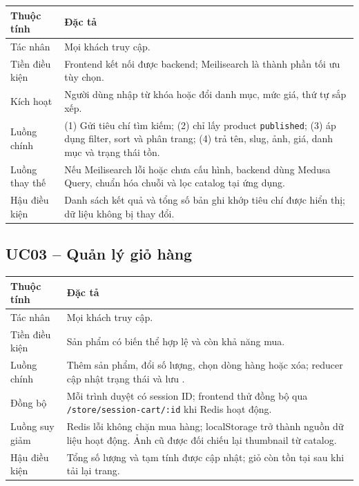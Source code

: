 \begin{longtable}{@{}L{0.23\textwidth}L{0.69\textwidth}@{}}
  \toprule
  \textbf{Thuộc tính} & \textbf{Đặc tả} \\
  \midrule
  Tác nhân & Mọi khách truy cập. \\
  Tiền điều kiện & Frontend kết nối được backend; Meilisearch là thành phần tối ưu tùy chọn. \\
  Kích hoạt & Người dùng nhập từ khóa hoặc đổi danh mục, mức giá, thứ tự sắp xếp. \\
  Luồng chính & (1) Gửi tiêu chí tìm kiếm; (2) chỉ lấy product \texttt{published}; (3) áp dụng filter, sort và phân trang; (4) trả tên, slug, ảnh, giá, danh mục và trạng thái tồn. \\
  Luồng thay thế & Nếu Meilisearch lỗi hoặc chưa cấu hình, backend dùng Medusa Query, chuẩn hóa chuỗi và lọc catalog tại ứng dụng. \\
  Hậu điều kiện & Danh sách kết quả và tổng số bản ghi khớp tiêu chí được hiển thị; dữ liệu không bị thay đổi. \\
  \bottomrule
\end{longtable}

\subsection{UC03 -- Quản lý giỏ hàng}

\begin{longtable}{@{}L{0.23\textwidth}L{0.69\textwidth}@{}}
  \toprule
  \textbf{Thuộc tính} & \textbf{Đặc tả} \\
  \midrule
  Tác nhân & Mọi khách truy cập. \\
  Tiền điều kiện & Sản phẩm có biến thể hợp lệ và còn khả năng mua. \\
  Luồng chính & Thêm sản phẩm, đổi số lượng, chọn dòng hàng hoặc xóa; reducer cập nhật trạng thái và lưu . \\
  Đồng bộ & Mỗi trình duyệt có session ID; frontend thử đồng bộ qua \texttt{/store/session-cart/:id} khi Redis hoạt động. \\
  Luồng suy giảm & Redis lỗi không chặn mua hàng; localStorage trở thành nguồn dữ liệu hoạt động. Ảnh cũ được đối chiếu lại thumbnail từ catalog. \\
  Hậu điều kiện & Tổng số lượng và tạm tính được cập nhật; giỏ còn tồn tại sau khi tải lại trang. \\
  \bottomrule
\end{longtable}

